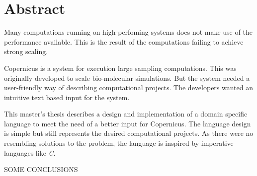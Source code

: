 \begingroup
\let\clearpage\relax
\let\cleardoublepage\relax
\let\cleardoublepage\relax

\chapter*{Abstract}

Many computations running on high-perfoming systems does not make use
of the performance available. This is the result of the computations
failing to achieve strong scaling.

Copernicus is a system for execution large sampling computations. This
was originally developed to scale bio-molecular simulations. But the
system needed a user-friendly way of describing computational
projects. The developers wanted an intuitive text based input for the
system.

This master's thesis describes a design and implementation of a domain
specific language to meet the need of a better input for
Copernicus. The language design is simple but still represents the
desired computational projects. As there were no resembling solutions
to the problem, the language is inspired by imperative languages
like \emph{C}.

SOME CONCLUSIONS

\endgroup			

\vfill

